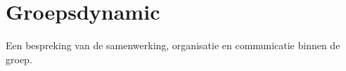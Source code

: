 
\chapter{Groepsdynamic}

Een bespreking van de samenwerking, organisatie en communicatie
binnen de groep.